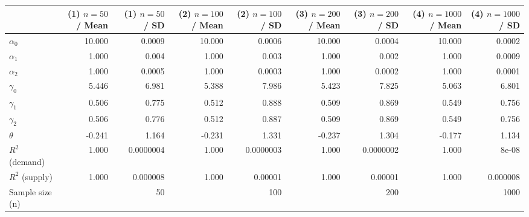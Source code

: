 
\begin{tabular}[t]{lrrrrrrrr}
\toprule
  & (1) $n=50$ / Mean & (1) $n=50$ / SD & (2) $n=100$ / Mean & (2) $n=100$ / SD & (3) $n=200$ / Mean & (3) $n=200$ / SD & (4) $n=1000$ / Mean & (4) $n=1000$ / SD\\
\midrule
$\alpha_{0}$ & 10.000 & 0.0009 & 10.000 & 0.0006 & 10.000 & 0.0004 & 10.000 & 0.0002\\
$\alpha_{1}$ & 1.000 & 0.004 & 1.000 & 0.003 & 1.000 & 0.002 & 1.000 & 0.0009\\
$\alpha_{2}$ & 1.000 & 0.0005 & 1.000 & 0.0003 & 1.000 & 0.0002 & 1.000 & 0.0001\\
$\gamma_{0}$ & 5.446 & 6.981 & 5.388 & 7.986 & 5.423 & 7.825 & 5.063 & 6.801\\
$\gamma_{1}$ & 0.506 & 0.775 & 0.512 & 0.888 & 0.509 & 0.869 & 0.549 & 0.756\\
$\gamma_{2}$ & 0.506 & 0.776 & 0.512 & 0.887 & 0.509 & 0.869 & 0.549 & 0.756\\
$\theta$ & -0.241 & 1.164 & -0.231 & 1.331 & -0.237 & 1.304 & -0.177 & 1.134\\
$R^{2}$ (demand) & 1.000 & 0.0000004 & 1.000 & 0.0000003 & 1.000 & 0.0000002 & 1.000 & 8e-08\\
$R^{2}$ (supply) & 1.000 & 0.000008 & 1.000 & 0.00001 & 1.000 & 0.00001 & 1.000 & 0.000008\\
Sample size (n) &  & 50 &  & 100 &  & 200 &  & 1000\\
\bottomrule
\end{tabular}
